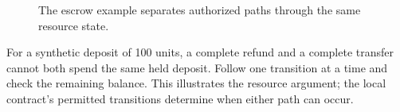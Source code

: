 \begin{figure}[H]
\centering
{}
\caption{The escrow example separates authorized paths through the same resource state.}\label{fig:teach-M04-06}
\end{figure}

For a synthetic deposit of 100 units, a complete refund and a complete transfer cannot both spend the same held deposit. Follow one transition at a time and check the remaining balance. This illustrates the resource argument; the local contract's permitted transitions determine when either path can occur.


